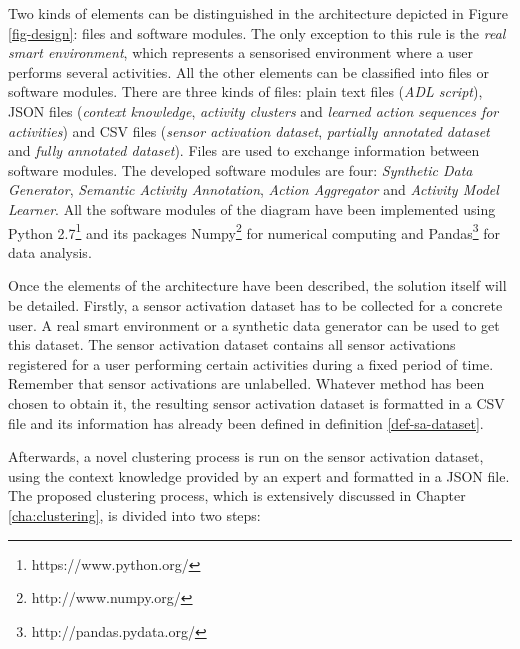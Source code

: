 Two kinds of elements can be distinguished in the architecture depicted in Figure \ref{fig-design}: files and software modules. The only exception to this rule is the \textit{real smart environment}, which represents a sensorised environment where a user performs several activities. All the other elements can be classified into files or software modules. There are three kinds of files: plain text files (\textit{ADL script}), JSON files (\textit{context knowledge}, \textit{activity clusters} and \textit{learned action sequences for activities}) and CSV files (\textit{sensor activation dataset}, \textit{partially annotated dataset} and \textit{fully annotated dataset}). Files are used to exchange information between software modules. The developed software modules are four: \textit{Synthetic Data Generator}, \textit{Semantic Activity Annotation}, \textit{Action Aggregator} and \textit{Activity Model Learner}. All the software modules of the diagram have been implemented using Python 2.7\footnote{https://www.python.org/} and its packages Numpy\footnote{http://www.numpy.org/} for numerical computing and Pandas\footnote{http://pandas.pydata.org/} for data analysis. 

Once the elements of the architecture have been described, the solution itself will be detailed. Firstly, a sensor activation dataset has to be collected for a concrete user. A real smart environment or a synthetic data generator can be used to get this dataset. The sensor activation dataset contains all sensor activations registered for a user performing certain activities during a fixed period of time. Remember that sensor activations are unlabelled. Whatever method has been chosen to obtain it, the resulting sensor activation dataset is formatted in a CSV file and its information has already been defined in definition \ref{def-sa-dataset}.

Afterwards, a novel clustering process is run on the sensor activation dataset, using the context knowledge provided by an expert and formatted in a JSON file. The proposed clustering process, which is extensively discussed in Chapter \ref{cha:clustering}, is divided into two steps: 


